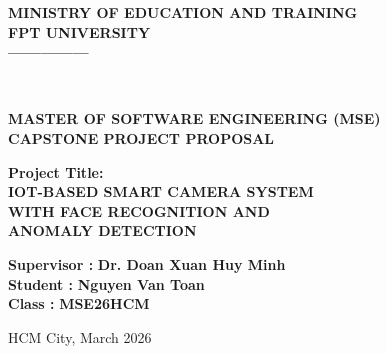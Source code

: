 \documentclass[12pt,a4paper]{article}
\begin{document}
\begin{titlepage}
    
    \begin{center}
        \textbf{\large MINISTRY OF EDUCATION AND TRAINING} \\
        \vspace{0.2cm}
        \textbf{\large FPT UNIVERSITY} \\
        \textbf{---------------} \\
        \vspace{1cm}

         \\
        \vspace{2cm}
        
        \textbf{\Large MASTER OF SOFTWARE ENGINEERING (MSE)} \\
        \vspace{0.5cm}
        \textbf{\Large CAPSTONE PROJECT PROPOSAL} \\
        \vspace{2cm}

        \begin{flushleft}
            \textbf{\Large Project Title:} \\
            \vspace{0.5cm}
            \textbf{\LARGE IOT-BASED SMART CAMERA SYSTEM} \\
            \vspace{0.3cm}
            \textbf{\LARGE WITH FACE RECOGNITION AND} \\
            \vspace{0.3cm}
            \textbf{\LARGE ANOMALY DETECTION} \\
            \vspace{1cm}
        \end{flushleft}
        
        \begin{flushright}
            \textbf{Supervisor :} \textbf{Dr. Doan Xuan Huy Minh} \\
            \vspace{0.5cm}
            \textbf{Student :} \textbf{Nguyen Van Toan} \\
            \vspace{0.5cm}
            \textbf{Class :} \textbf{MSE26HCM}
        \end{flushright}
        
        \vfill
        HCM City, March 2026
    \end{center}
\end{titlepage}
\end{document}
